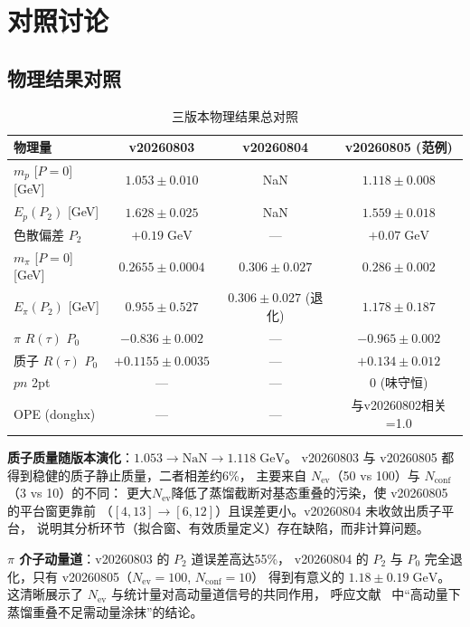 \documentclass[11pt,a4paper]{article}
\newcommand{\gev}{\;\mathrm{GeV}}
\newcommand{\Nconf}{N_{\mathrm{conf}}}
\newcommand{\Nev}{N_{\mathrm{ev}}}
\begin{document}
\section{对照讨论}

\subsection{物理结果对照}

\begin{table}[H]
\centering
\caption{三版本物理结果总对照}
\label{tab:all-compare}
\small
\begin{tabular}{lccc}
\toprule
物理量 & v20260803 & v20260804 & v20260805 (范例)\\
\midrule
$m_p$ [$P{=}0$] [GeV] & $1.053\pm0.010$ & NaN & $\mathbf{1.118\pm0.008}$\\
$E_p(P_2)$ [GeV] & $1.628\pm0.025$ & NaN & $1.559\pm0.018$\\
色散偏差 $P_2$ & $+0.19\gev$ & — & $+0.07\gev$\\
$m_\pi$ [$P{=}0$] [GeV] & $0.2655\pm0.0004$ & $0.306\pm0.027$ & $0.286\pm0.002$\\
$E_\pi(P_2)$ [GeV] & $0.955\pm0.527$ & $0.306\pm0.027$ (退化) & $1.178\pm0.187$\\
$\pi$ $R(\tau)$ $P_0$ & $-0.836\pm0.002$ & — & $-0.965\pm0.002$\\
质子 $R(\tau)$ $P_0$ & $+0.1155\pm0.0035$ & — & $+0.134\pm0.012$\\
$pn$ 2pt & — & — & 0 (味守恒)\\
OPE (donghx) & — & — & 与v20260802相关=1.0\\
\bottomrule
\end{tabular}
\end{table}

\textbf{质子质量随版本演化}：$1.053\to\mathrm{NaN}\to1.118\gev$。
v20260803 与 v20260805 都得到稳健的质子静止质量，二者相差约6\%，
主要来自 $\Nev$（50 vs 100）与 $\Nconf$（3 vs 10）的不同：
更大$\Nev$降低了蒸馏截断对基态重叠的污染，使 v20260805 的平台窗更靠前
（$[4,13]\to[6,12]$）且误差更小。v20260804 未收敛出质子平台，
说明其分析环节（拟合窗、有效质量定义）存在缺陷，而非计算问题。

\textbf{$\pi$ 介子动量道}：v20260803 的 $P_2$ 道误差高达55\%，
v20260804 的 $P_2$ 与 $P_0$ 完全退化，只有 v20260805（$\Nev=100$, $\Nconf=10$）
得到有意义的 $1.18\pm0.19\gev$。这清晰展示了 $\Nev$ 与统计量对高动量道信号的共同作用，
呼应文献~\cite{distillation-high-p,bali2016} 中“高动量下蒸馏重叠不足需动量涂抹”的结论。
\end{document}
